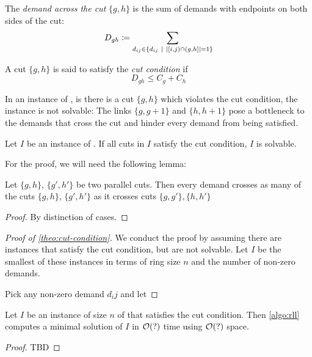 \begin{definition}
	The \emph{demand across the cut} $\{g, h\}$ is the sum of demands with endpoints on both sides of the cut:
	\begin{equation}
		D_{gh} \coloneqq \sum_{d_{ij} \in \{d_{ij}\ |\ \abs{[i, j) \cap (g, h]} = 1\}} 
	\end{equation}
\end{definition}

\begin{definition}
	A cut $\{g, h\}$ is said to satisfy the \emph{cut condition} if
	\begin{equation}
		D_{gh} \leq C_g + C_h
	\end{equation}
\end{definition}

In an instance of \RRL, is there is a cut $\{g, h\}$ which violates the cut condition, the instance is not solvable:
The links $\{g, g+1\}$ and $\{h, h+1\}$ pose a bottleneck to the demands that cross the cut and hinder every demand from being satisfied.


\begin{theorem}
	\label{theo:cut-condition}
	Let $I$ be an instance of \RRL.
	If all cuts in $I$ satisfy the cut condition, $I$ is solvable.
\end{theorem}
For the proof, we will need the following lemma:
\begin{lemma}
	Let $\{g, h\}$, $\{g', h'\}$ be two parallel cuts.
	Then every demand crosses as many of the cuts $\{g, h\}$, $\{g', h'\}$ as it crosses cuts $\{g, g'\}, \{h, h'\}$
\end{lemma}
\begin{proof}
	By distinction of cases.
\end{proof}
\begin{proof}[Proof of \cref{theo:cut-condition}]
	We conduct the proof by assuming there are instances that satisfy the cut condition, but are not solvable.
	Let $I$ be the smallest of these instances in terms of ring size $n$ and the number of non-zero demands.
	
	Pick any non-zero demand $d_ij$ and let 
\end{proof}



\begin{theorem}
	\label{theo:rll-algo-correct}
	Let $I$ be an instance of size $n$ of \RRL that satisfies the cut condition.
	Then \cref{algo:rll} computes a minimal solution of $I$ in $\mathcal{O}(?)$ time using $\mathcal{O}(?)$ space.
\end{theorem}
\begin{proof}
	TBD
\end{proof}

